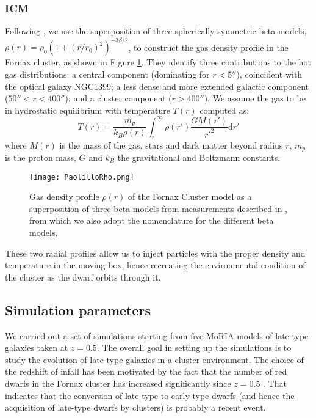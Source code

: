 \subsubsection{ICM} \label{sec:ICM}
Following \citet{Paolillo2002}, we use the superposition of three spherically symmetric beta-models, $\rho(r) = \rho_0 (1 + (r/r_0)^2 )^{-3\beta/2}$, to construct the gas density profile in the Fornax cluster, as shown in Figure \ref{fig:profiles}.
They identify three contributions to the hot gas distributions: a central component (dominating for $r<5''$), coincident with the optical galaxy NGC1399; a less dense and more extended galactic component ($50''<r<400''$); and a cluster component ($r>400''$).
We assume the gas to be in hydrostatic equilibrium with temperature $T(r)$ computed as:
\begin{equation}
   T(r) = \frac {m_p}{k_B \rho(r)} \int_r^\infty \rho(r') \frac{GM(r')}{r'^2} \mathrm{d} r'
\end{equation}
where $M(r)$ is the mass of the gas, stars and dark matter beyond radius $r$, $m_p$ is the proton mass, $G$ and $k_B$ the gravitational and Boltzmann constants.

\begin{figure}
\centering
\texttt{[image: PaolilloRho.png]}
\caption{Gas density profile $\rho(r)$ of the  Fornax Cluster model as a superposition of three beta models from measurements described in \citet{Paolillo2002}, from which we also adopt the nomenclature for the different beta models.
}
\label{fig:profiles}
\end{figure}

These two radial profiles allow us to inject particles with the proper density and temperature in the moving box, hence recreating the environmental condition of the cluster as the dwarf orbits through it.

\subsection{Simulation parameters}
We carried out a set of simulations starting from five MoRIA models of late-type galaxies taken at $z = 0.5$.
The overall goal in setting up the simulations is to study the evolution of late-type galaxies in a cluster environment.
The choice of the redshift of infall has been motivated by the fact that the number of red dwarfs in the Fornax cluster has increased significantly since $z = 0.5$ \citep{Stott2007, DeRijcke2010}.
That indicates that the conversion of late-type to early-type dwarfs (and hence the acquisition of late-type dwarfs by clusters) is probably a recent event.

